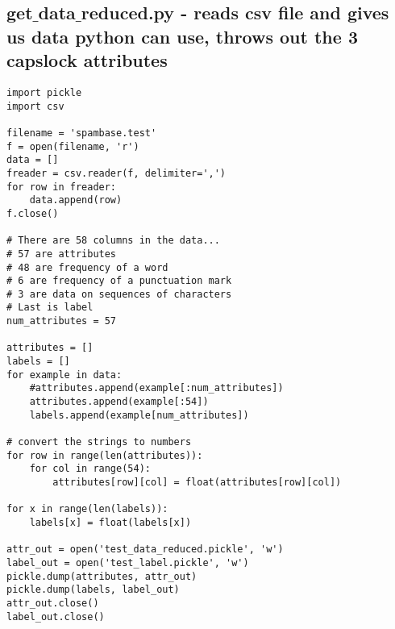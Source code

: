 \documentclass[11pt]{article} %
\begin{document}
\subsection{get$\_$data$\_$reduced.py - reads csv file and gives us data python can use, throws out the 3 capslock attributes}
\begin{lstlisting}
import pickle
import csv

filename = 'spambase.test'
f = open(filename, 'r')
data = []
freader = csv.reader(f, delimiter=',')
for row in freader:
    data.append(row)    
f.close()

# There are 58 columns in the data...
# 57 are attributes
# 48 are frequency of a word
# 6 are frequency of a punctuation mark
# 3 are data on sequences of characters
# Last is label
num_attributes = 57

attributes = []
labels = []
for example in data:
    #attributes.append(example[:num_attributes])
    attributes.append(example[:54])
    labels.append(example[num_attributes])
    
# convert the strings to numbers
for row in range(len(attributes)):
    for col in range(54):
        attributes[row][col] = float(attributes[row][col])
        
for x in range(len(labels)):
    labels[x] = float(labels[x])
    
attr_out = open('test_data_reduced.pickle', 'w')
label_out = open('test_label.pickle', 'w')
pickle.dump(attributes, attr_out)
pickle.dump(labels, label_out)
attr_out.close()
label_out.close()
\end{lstlisting}
\end{document}
